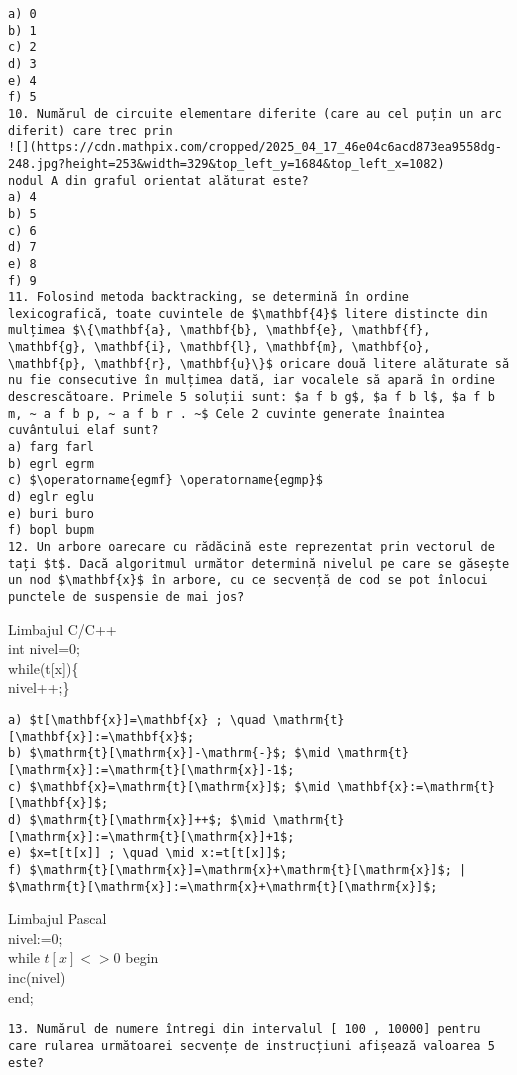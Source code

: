 \begin{verbatim}
a) 0
b) 1
c) 2
d) 3
e) 4
f) 5
10. Numărul de circuite elementare diferite (care au cel puțin un arc diferit) care trec prin
![](https://cdn.mathpix.com/cropped/2025_04_17_46e04c6acd873ea9558dg-248.jpg?height=253&width=329&top_left_y=1684&top_left_x=1082)
nodul A din graful orientat alăturat este?
a) 4
b) 5
c) 6
d) 7
e) 8
f) 9
11. Folosind metoda backtracking, se determină în ordine lexicografică, toate cuvintele de $\mathbf{4}$ litere distincte din mulțimea $\{\mathbf{a}, \mathbf{b}, \mathbf{e}, \mathbf{f}, \mathbf{g}, \mathbf{i}, \mathbf{l}, \mathbf{m}, \mathbf{o}, \mathbf{p}, \mathbf{r}, \mathbf{u}\}$ oricare două litere alăturate să nu fie consecutive în mulțimea dată, iar vocalele să apară în ordine descrescătoare. Primele 5 soluții sunt: $a f b g$, $a f b l$, $a f b m, ~ a f b p, ~ a f b r . ~$ Cele 2 cuvinte generate înaintea cuvântului elaf sunt?
a) farg farl
b) egrl egrm
c) $\operatorname{egmf} \operatorname{egmp}$
d) eglr eglu
e) buri buro
f) bopl bupm
12. Un arbore oarecare cu rădăcină este reprezentat prin vectorul de tați $t$. Dacă algoritmul următor determină nivelul pe care se găsește un nod $\mathbf{x}$ în arbore, cu ce secvență de cod se pot înlocui punctele de suspensie de mai jos?
\end{verbatim}

Limbajul C/C++\\
int nivel=0;\\[0pt]
while(t[x])\{\\
nivel++;\}

\begin{verbatim}
a) $t[\mathbf{x}]=\mathbf{x} ; \quad \mathrm{t}[\mathbf{x}]:=\mathbf{x}$;
b) $\mathrm{t}[\mathrm{x}]-\mathrm{-}$; $\mid \mathrm{t}[\mathrm{x}]:=\mathrm{t}[\mathrm{x}]-1$;
c) $\mathbf{x}=\mathrm{t}[\mathrm{x}]$; $\mid \mathbf{x}:=\mathrm{t}[\mathbf{x}]$;
d) $\mathrm{t}[\mathrm{x}]++$; $\mid \mathrm{t}[\mathrm{x}]:=\mathrm{t}[\mathrm{x}]+1$;
e) $x=t[t[x]] ; \quad \mid x:=t[t[x]]$;
f) $\mathrm{t}[\mathrm{x}]=\mathrm{x}+\mathrm{t}[\mathrm{x}]$; | $\mathrm{t}[\mathrm{x}]:=\mathrm{x}+\mathrm{t}[\mathrm{x}]$;
\end{verbatim}

Limbajul Pascal\\
nivel:=0;\\
while $t[x]<>0$ begin\\
inc(nivel)\\
end;

\begin{verbatim}
13. Numărul de numere întregi din intervalul [ 100 , 10000] pentru care rularea următoarei secvențe de instrucțiuni afișează valoarea 5 este?
\end{verbatim}

